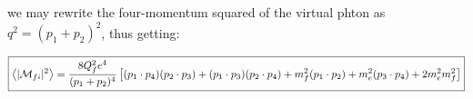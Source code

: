 \documentclass[11pt]{article}
\theoremstyle{definition}
\begin{document}
we may rewrite the four-momentum squared of the virtual phton as $q^2=(p_1+p_2)^2$, thus getting:

\begin{equation}
\boxed{
    \expval{|\mathcal{M}_{fi}|^2}
    =
    \frac{8Q_f^2e^4}{(p_1+p_2)^4}
    \left[
        (p_1 \cdot p_4) (p_2 \cdot p_3)
        + (p_1 \cdot p_3) (p_2 \cdot p_4)
        + m_f^2(p_1 \cdot p_2)
        + m_e^2(p_3 \cdot p_4)
        + 2m_e^2m_f^2  
    \right]
}
\end{equation}




\end{document}
